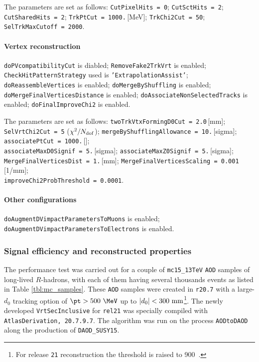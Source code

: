 The parameters are set as follows: {\tt CutPixelHits = 0}; {\tt CutSctHits = 2}; {\tt CutSharedHits = 2}; {\tt TrkPtCut = 1000.}\,[MeV]; {\tt TrkChi2Cut = 50}; {\tt SelTrkMaxCutoff = 2000}.

\paragraph{Vertex reconstruction}
{\tt doPVcompatibilityCut} is diabled; {\tt RemoveFake2TrkVrt} is enabled; {\tt CheckHitPatternStrategy} used is {\tt 'ExtrapolationAssist'}; {\tt doReassembleVertices} is enabled; {\tt doMergeByShuffling} is enabled; {\tt doMergeFinalVerticesDistance} is enabled; {\tt doAssociateNonSelectedTracks} is enabled; {\tt doFinalImproveChi2} is enabled.

The parameters are set as follows: {\tt twoTrkVtxFormingD0Cut = 2.0}\,[mm];\\
{\tt SelVrtChi2Cut = 5} ($\chi^{2}/N_{\rm dof}$); {\tt mergeByShufflingAllowance = 10.}\,[sigma];\\
{\tt associatePtCut = 1000.}\,[\MeV];\\
{\tt associateMaxD0Signif = 5.}\,[sigma]; {\tt associateMaxZ0Signif = 5.}\,[sigma];\\
{\tt MergeFinalVerticesDist = 1.}\,[mm]; {\tt MergeFinalVerticesScaling = 0.001}\,[1/mm];\\ {\tt improveChi2ProbThreshold = 0.0001}.

\paragraph{Other configurations}
{\tt doAugmentDVimpactParametersToMuons} is enabled; {\tt doAugmentDVimpactParametersToElectrons} is enabled.

\subsubsection{Signal efficiency and reconstructed properties}
The performance test was carried out for a couple of {\tt mc15\_13TeV} {\tt AOD} samples of long-lived $R$-hadrons, with each of them having several thousands events as listed in Table \ref{tbl:mc_samples}. These {\tt AOD} samples were created in {\tt r20.7} with a large-$d_{0}$ tracking option of $\pt>500~\MeV$ up to $|d_{0}|<300~{\rm mm}$\footnote{For release {\tt 21} reconstruction the \pt threshold is raised to 900~\MeV.}. The newly developed {\tt VrtSecInclusive} for {\tt rel21} was specially compiled with {\tt AtlasDerivation, 20.7.9.7}. The algorithm was run on the process {\tt AODtoDAOD} along the production of {\tt DAOD\_SUSY15}.

